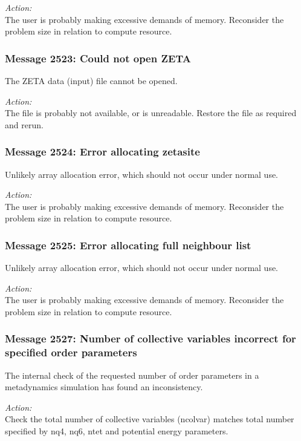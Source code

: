 \noindent
{\em Action:}\\ The user is probably making excessive demands of
memory. Reconsider the problem size in relation to compute resource.
          
\subsubsection*{Message 2523: Could not open ZETA}
          
The ZETA data (input) file cannot be opened.

\noindent
{\em Action:}\\ The file is probably not available, or is unreadable. Restore
the file as required and rerun.
          
\subsubsection*{Message 2524: Error allocating zetasite}

Unlikely array allocation error, which should not occur under normal use.

\noindent
{\em Action:}\\ The user is probably making excessive demands of
memory. Reconsider the problem size in relation to compute resource.
          
\subsubsection*{Message 2525: Error allocating full neighbour list}

Unlikely array allocation error, which should not occur under normal use.

\noindent
{\em Action:}\\ The user is probably making excessive demands of
memory. Reconsider the problem size in relation to compute resource.
          
\subsubsection*{Message 2527: Number of collective variables incorrect
for specified order parameters}

The internal check of the requested number of order parameters in a
metadynamics simulation has found an inconsistency.

\noindent
{\em Action:}\\ Check the total number of collective variables (ncolvar) 
matches total number specified by nq4, nq6, ntet and potential energy
parameters.

